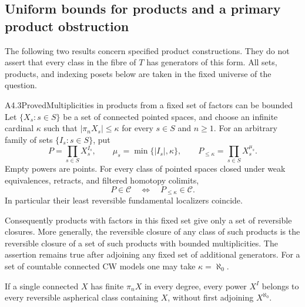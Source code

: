 \subsection{Uniform bounds for products and a primary product obstruction}
\label{sec:A4-products}

The following two results concern specified product constructions.
They do not assert that every class in the fibre of $T$ has generators
of this form.  All sets, products, and indexing posets below are taken
in the fixed universe of the question.

\begin{claim}{A4.3}{Proved}{Multiplicities in products from a fixed set of factors can be bounded}\label{A43}
Let $\{X_s:s\in S\}$ be a set of connected pointed spaces, and choose
an infinite cardinal $\kappa$ such that
$|\pi_nX_s|\leq\kappa$ for every $s\in S$ and $n\geq1$.
For an arbitrary family of sets $\{I_s:s\in S\}$, put
\[
 P=\prod_{s\in S}X_s^{I_s},\qquad
 \mu_s=\min\{|I_s|,\kappa\},\qquad
 P_{\leq\kappa}=\prod_{s\in S}X_s^{\mu_s}.
 \tag{A4.3.1}
\]
Empty powers are points.  For every class of pointed spaces closed
under weak equivalences, retracts, and filtered homotopy colimits,
\[
             P\in\mathcal C
       \quad\Longleftrightarrow\quad P_{\leq\kappa}\in\mathcal C.
 \tag{A4.3.2}
\]
In particular their least reversible fundamental localizers coincide.

Consequently products with factors in this fixed set give only a set
of reversible closures.  More generally, the reversible closure of
any class of such products is the reversible closure of a set of such
products with bounded multiplicities.  The assertion remains true
after adjoining any fixed set of additional generators.  For a set of
countable connected CW models one may take $\kappa=\aleph_0$.

If a single connected $X$ has finite $\pi_nX$ in every degree, every
power $X^I$ belongs to every reversible aspherical class containing
$X$, without first adjoining $X^{\aleph_0}$.
\end{claim}
